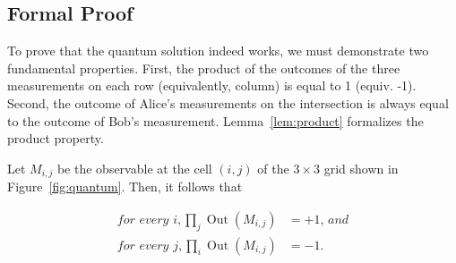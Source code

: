 \documentclass{llncs}
\begin{document}
\subsection{Formal Proof}
To prove that the quantum solution indeed works, we must demonstrate
two fundamental properties. First, the product of the outcomes of the
three measurements on each row (equivalently, column) is equal to 1
(equiv. -1). Second, the outcome of Alice's measurements on the
intersection is always equal to the outcome of Bob's
measurement. Lemma~\ref{lem:product} formalizes the product property.

\begin{lemma}
  \label{lem:product}
  Let \(M_{i, j}\) be the observable at the cell \((i, j)\) of the
  \(3 \times 3\) grid shown in Figure~\ref{fig:quantum}. Then,
  it follows that

  \begin{align}
    \textit{for every }i, \prod_{j} \operatorname{Out}(M_{i, j}) &= +1  \textit{, and} \\
    \textit{for every }j, \prod_{i} \operatorname{Out}(M_{i, j}) &= -1.
  \end{align}
\end{lemma}
\end{document}
